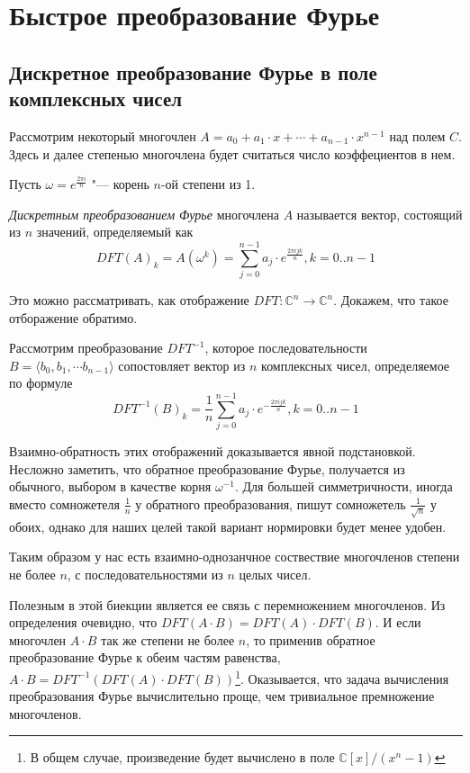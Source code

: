 \documentclass[12pt,a4paper]{article}
\renewcommand{\C}{\mathbb{C}}
\theoremstyle{plain}
\begin{document}
\section{Быстрое преобразование Фурье}

\subsection{Дискретное преобразование Фурье в поле комплексных чисел}


Рассмотрим некоторый многочлен $A = a_0 + a_1\cdot x + \cdots + a_{n-1}\cdot x^{n-1}$ над полем $C$.
Здесь и далее степенью многочлена будет считаться число коэффециентов в нем. 

Пусть $\omega = e^{\frac{2\pi i}{n}}$ "--- корень $n$-ой степени из 1.

\emph{Дискретным преобразованием Фурье} многочлена $A$ называется 
вектор, состоящий из $n$ значений, определяемый как 
$$DFT(A)_k = A(\omega ^ k) = \sum\limits_{j=0}^{n-1}{a_j \cdot e^{\frac{2\pi i j k}{n}}}, k = 0..n-1$$

Это можно рассматривать, как отображение $DFT : \C^n \rightarrow \C^n$.
Докажем, что такое отборажение обратимо. 

Рассмотрим преобразование $DFT^{-1}$, которое последовательности $B = \langle b_0, b_1, \cdots b_{n-1} \rangle$
сопостовляет вектор из $n$ комплексных чисел, определяемое по формуле
$$DFT^{-1}(B)_k = \frac{1}{n}\sum\limits_{j=0}^{n-1}{a_j \cdot e^{-\frac{2\pi i j k}{n}}}, k = 0..n-1$$

Взаимно-обратность этих отображений доказывается явной подстановкой.
Несложно заметить, что обратное преобразование Фурье, получается из обычного,
выбором в качестве корня $\omega^{-1}$. Для большей симметричности,
иногда вместо сомножетеля $\frac{1}{n}$ у обратного преобразования, пишут
сомножетель $\frac{1}{\sqrt{n}}$ у обоих, однако для наших целей такой вариант нормировки будет менее удобен.

Таким образом у нас есть взаимно-однозанчное соствествие многочленов степени
не более $n$, с последовательностями из $n$ целых чисел.

Полезным в этой биекции является ее связь с перемножением многочленов.
Из определения очевидно, что $DFT(A \cdot B) = DFT(A) \cdot DFT(B)$.
И если многочлен $A \cdot B$ так же степени не более $n$, то применив
обратное преобразование Фурье к обеим частям равенства,
$A \cdot B = DFT^{-1}(DFT(A) \cdot DFT(B))$\footnote{В общем случае, произведение
будет вычислено в поле $\C[x]/(x^n - 1)$}.
Оказывается, что задача вычисления преобразования Фурье вычислительно проще,
чем тривиальное премножение многочленов.
\end{document}
